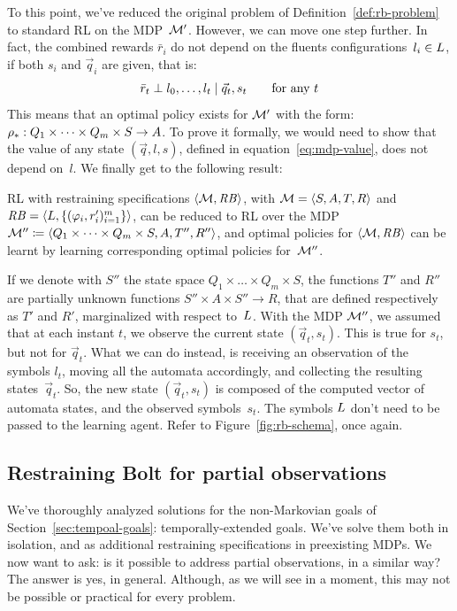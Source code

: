 To this point, we've reduced the original problem of
Definition~\ref{def:rb-problem} to standard RL on the MDP~$\mathcal{M}'$. However,
we can move one step further. In fact, the combined rewards $\bar{r}_i$ do not
depend on the fluents configurations~$l_i \in L$, if both $s_i$
and $\vec{q}_i$ are given, that is:
\[
	\bar{r}_t \perp l_0, \dots, l_t \mid \vec{q}_t, s_t \qquad
	\text{for any $t$}
\]
This means that an optimal policy exists for $\mathcal{M}'$ with the form:
${\rho}_*: Q_1 \times \dots \times Q_m \times S \to A$.
To prove it formally, we would need to show that the value of any state
$(\vec{q}, l, s)$, defined in equation~\eqref{eq:mdp-value}, does not depend
on~$l$. We finally get to the following result:
\begin{theorem}
	\cite{bib:bolt} RL with \ldl{} restraining specifications
	$\langle \mathcal{M}, \text{\textit{RB}} \rangle$, with $\mathcal{M} = \langle S, A, T,
	R \rangle$ and $\text{\textit{RB}} = \langle L, \{(\varphi_i,
	r_i')_{i=1}^m\} \rangle$, can be reduced to RL over the MDP $\mathcal{M}'' \coloneqq
	\langle Q_1 \times \dots \times Q_m \times S, A, T'', R''\rangle$,
	and optimal policies for $\langle \mathcal{M}, \text{\textit{RB}} \rangle$ can be learnt
	by learning corresponding optimal policies for~$\mathcal{M}''$.
	\label{th:bolt-equivalence}
\end{theorem}
If we denote with $S''$ the state space $Q_1 \times \dots \times Q_m \times
S$, the functions $T''$ and $R''$ are partially unknown functions $S'' \times
A \times S'' \to R$, that are defined respectively as $T'$ and $R'$,
marginalized with respect to~$L$. With the MDP $\mathcal{M}''$, we assumed
that at each instant $t$, we observe the current state $(\vec{q}_t, s_t)$.
This is true for $s_t$, but not for $\vec{q}_t$. What we can do instead, is
receiving an observation of the symbols $l_t$, moving all the automata
accordingly, and collecting the resulting states~$\vec{q}_t$. So, the new
state $(\vec{q}_t, s_t)$ is composed of the computed vector of automata
states, and the observed symbols~$s_t$. The symbols $L$ don't need
to be passed to the learning agent. Refer to Figure~\ref{fig:rb-schema}, once
again.


\subsection{Restraining Bolt for partial observations}

We've thoroughly analyzed solutions for the non-Markovian goals of
Section~\ref{sec:tempoal-goals}: temporally-extended goals. We've solve them
both in isolation, and as additional restraining specifications in preexisting
MDPs. We now want to ask: is it possible to address partial observations, in a
similar way? The answer is yes, in general. Although, as we will see in a
moment, this may not be possible or practical for every problem.

